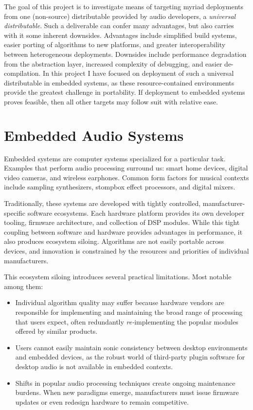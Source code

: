 The goal of this project is to investigate means of targeting myriad deployments from one (non-source) distributable provided by audio developers, a \textit{universal distributable}. Such a deliverable can confer many advantages, but also carries with it some inherent downsides. Advantages include simplified build systems, easier porting of algorithms to new platforms, and greater interoperability between heterogeneous deployments. Downsides include performance degradation from the abstraction layer, increased complexity of debugging, and easier de-compilation. In this project I have focused on deployment of such a universal distributable in embedded systems, as these resource-contained environments provide the greatest challenge in portability. If deployment to embedded systems proves feasible, then all other targets may follow suit with relative ease.

\section { Embedded Audio Systems }

Embedded systems are computer systems specialized for a particular task\cite{catsoulis2005designing}. Examples that perform audio processing surround us: smart home devices, digital video cameras, and wireless earphones. Common form factors for musical contexts include sampling synthesizers, stompbox effect processors, and digital mixers.

Traditionally, these systems are developed with tightly controlled, manufacturer-specific software ecosystems\cite{10.1145/266021.266373}. Each hardware platform provides its own developer tooling, firmware architecture, and collection of DSP modules. While this tight coupling between software and hardware provides advantages in performance, it also produces ecosystem siloing. Algorithms are not easily portable across devices, and innovation is constrained by the resources and priorities of individual manufacturers.

This ecosystem siloing introduces several practical limitations. Most notable among them:

\begin{itemize}
    \item Individual algorithm quality may suffer because hardware vendors are responsible for implementing and maintaining the broad range of processing that users expect, often redundantly \textit{re-}implementing the popular modules offered by similar products.

    \item Users cannot easily maintain sonic consistency between desktop environments and embedded devices, as the robust world of third-party plugin software for desktop audio is not available in embedded contexts.

    \item Shifts in popular audio processing techniques create ongoing maintenance burdens. When new paradigms emerge, manufacturers must issue firmware updates or even redesign hardware to remain competitive.
\end{itemize}

